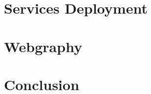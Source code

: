 \documentclass[11pt]{article}
\begin{document}
    \newpage
    \section{Services Deployment}\label{sec:ServiceDeployment}
    

    \newpage
    \section{Webgraphy}\label{sec:Webgraphy}
    

    \newpage
    \section{Conclusion}\label{sec:Conclusion}
    
\end{document}
